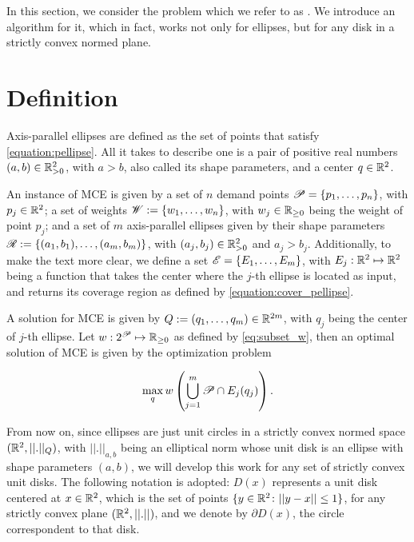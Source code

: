 In this section, we consider the problem which we refer to as . We introduce an algorithm for it, which in fact, works not only for ellipses, but for any disk in a strictly convex normed plane.

\section{Definition}

Axis-parallel ellipses are defined as the set of points that satisfy \autoref{equation:pellipse}. All it takes to describe one is a pair of positive real numbers $(a,b) \in \mathbb{R}_{>0}^2$, with $a>b$, also called its shape parameters, and a center $q \in \mathbb{R}^2$.

An instance of MCE is given by a set of $n$ demand points $\mathscr{P} = \{p_1, \dots, p_n\}$, with $p_j\in\mathbb{R}^2$; 
a set of weights $\mathscr{W}:=\{w_1, \dots, w_n\}$, with $w_j\in\mathbb{R}_{\ge0}$ being the weight of point $p_j$;
and a set of $m$ axis-parallel ellipses given by their shape parameters $\mathscr{R}:=\{(a_1, b_1), \dots, (a_m, b_m)\}$, with $(a_j, b_j)\in\mathbb{R}_{>0}^2$ and $a_j>b_j$.
Additionally, to make the text more clear, we define a set $\mathscr{E} = \{E_1, \dots, E_m\}$, with $E_j : \mathbb{R}^2 \mapsto \mathbb{R}^2$ being a function that takes the center where the $j$-th ellipse is located as input, and returns its coverage region as defined by \autoref{equation:cover_pellipse}.

A solution for MCE is given by $Q:=(q_1, \dots, q_m)\in\mathbb{R}^{2m}$, with $q_j$ being the center of $j$-th ellipse. Let $w : 2^{\mathscr{P}} \mapsto \mathbb{R}_{\ge0}$ as defined by \autoref{eq:subset_w}, then an optimal solution of MCE is given by the optimization problem

\begin{equation*}
	\max_q w\left(\bigcup_{j=1}^m \mathscr{P} \cap E_j(q_j)\right).
\end{equation*}

From now on, since ellipses are just unit circles in a strictly convex normed space $(\mathbb{R}^2, ||.||_Q)$, with $||.||_{a, b}$ being an elliptical norm whose unit disk is an ellipse with shape parameters $(a, b)$, we will develop this work for any set of strictly convex unit disks. The following notation is adopted: $D(x)$ represents a unit disk centered at $x\in \mathbb{R}^2$, which is the set of points $\{y \in \mathbb{R}^2 \colon ||y-x|| \le 1 \}$, for any strictly convex plane $(\mathbb{R}^2, ||.||)$, and we denote by $\partial D(x)$, the circle correspondent to that disk.

